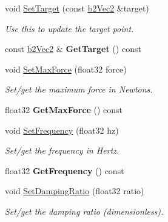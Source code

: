 \begin{DoxyCompactItemize}
void \hyperlink{classb2_mouse_joint_a96f34c1c990407eddbadf07ae359b1f3}{Set\+Target} (const \hyperlink{structb2_vec2}{b2\+Vec2} \&target)
\begin{DoxyCompactList}\small\item\em Use this to update the target point. \end{DoxyCompactList}\item 
\mbox{\label{classb2_mouse_joint_a9904bbdf5b73f49954f37c27c983d715}} 
const \hyperlink{structb2_vec2}{b2\+Vec2} \& {\bfseries Get\+Target} () const
\item 
\mbox{\label{classb2_mouse_joint_a4beba6ea0827960fac2474563591c03a}} 
void \hyperlink{classb2_mouse_joint_a4beba6ea0827960fac2474563591c03a}{Set\+Max\+Force} (float32 force)
\begin{DoxyCompactList}\small\item\em Set/get the maximum force in Newtons. \end{DoxyCompactList}\item 
\mbox{\label{classb2_mouse_joint_a61c9fbd78498d3484f824876654eb015}} 
float32 {\bfseries Get\+Max\+Force} () const
\item 
\mbox{\label{classb2_mouse_joint_a8b37706535923637ca280c5a0467b14d}} 
void \hyperlink{classb2_mouse_joint_a8b37706535923637ca280c5a0467b14d}{Set\+Frequency} (float32 hz)
\begin{DoxyCompactList}\small\item\em Set/get the frequency in Hertz. \end{DoxyCompactList}\item 
\mbox{\label{classb2_mouse_joint_a97b9264cc357ac96e447990f52086719}} 
float32 {\bfseries Get\+Frequency} () const
\item 
\mbox{\label{classb2_mouse_joint_a648c8f3ecb82f4887c0eefcfe48cbd37}} 
void \hyperlink{classb2_mouse_joint_a648c8f3ecb82f4887c0eefcfe48cbd37}{Set\+Damping\+Ratio} (float32 ratio)
\begin{DoxyCompactList}\small\item\em Set/get the damping ratio (dimensionless). \end{DoxyCompactList}\item 

\end{DoxyCompactItemize}
